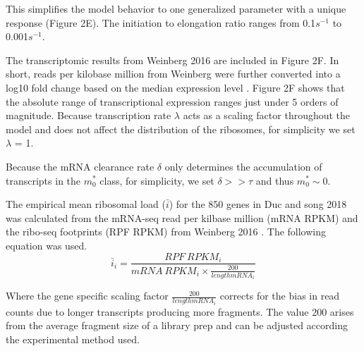 \documentclass[a4,center,fleqn,nocrop]{NAR}
\newcommand{\MRL}{\ensuremath{\bar{i}}\xspace}
\begin{document}
This simplifies the model behavior to one generalized parameter with a unique response (Figure 2E).  The initiation to elongation ratio ranges from 0.1$s^{-1}$ to 0.001$s^{-1}$.

The transcriptomic results from Weinberg 2016 are included in Figure 2F. In short, reads per kilobase million from Weinberg were further converted into a log10 fold change based on the median expression level \citep{RN29}. Figure 2F shows that the absolute range of transcriptional expression ranges just under 5 orders of magnitude. Because transcription rate $\lambda$ acts as a scaling factor throughout the model and does not affect the distribution of the ribosomes, for simplicity we set $\lambda$ = 1.

Because the mRNA clearance rate $\delta$ only determines the accumulation of transcripts in the  $m_0^*$  class, for simplicity, we set $\delta >> \tau$ and thus  $m_0^* \sim 0$.
 
The empirical mean ribosomal load (\MRL) for the 850 genes in Duc and song 2018 was calculated from the mRNA-seq read per kilbase million (mRNA RPKM) and the ribo-seq footprints (RPF RPKM) from Weinberg 2016 \citep{RN29}. The following equation was used.
\begin{equation}\label{eq:MRL}
	\MRL_i = \frac{RPF\: RPKM_i}{mRNA\: RPKM_i \times \frac{200}{length mRNA_i}}
\end{equation}

Where the gene specific scaling factor $\frac{200}{length mRNA_i}$ corrects for the bias in read counts due to longer transcripts producing more fragments. The value 200 arises from the average fragment size of a library prep and can be adjusted according the experimental method used.
\end{document}
